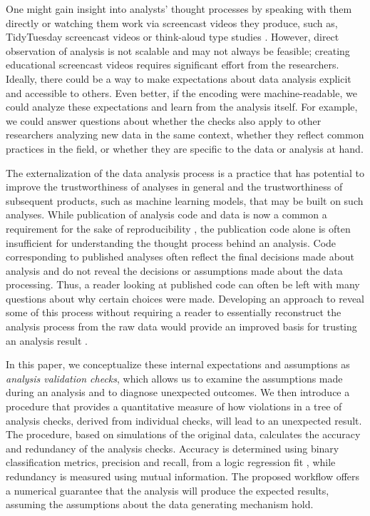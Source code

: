 \documentclass[
  12pt,
]{interact}
\begin{document}
One might gain insight into analysts' thought processes by speaking with
them directly or watching them work via screencast videos they produce,
such as, TidyTuesday screencast videos or think-aloud type studies
\citep[e.g.][]{gu2024data}. However, direct observation of analysis is
not scalable and may not always be feasible; creating educational
screencast videos requires significant effort from the researchers.
Ideally, there could be a way to make expectations about data analysis
explicit and accessible to others. Even better, if the encoding were
machine-readable, we could analyze these expectations and learn from the
analysis itself. For example, we could answer questions about whether
the checks also apply to other researchers analyzing new data in the
same context, whether they reflect common practices in the field, or
whether they are specific to the data or analysis at hand.

The externalization of the data analysis process is a practice that has
potential to improve the trustworthiness of analyses in general
\citep{yu2024veridical} and the trustworthiness of subsequent products,
such as machine learning models, that may be built on such analyses.
While publication of analysis code and data is now a common a
requirement for the sake of reproducibility
\citep{peng2011reproducible}, the publication code alone is often
insufficient for understanding the thought process behind an analysis.
Code corresponding to published analyses often reflect the final
decisions made about analysis and do not reveal the decisions or
assumptions made about the data processing. Thus, a reader looking at
published code can often be left with many questions about why certain
choices were made. Developing an approach to reveal some of this process
without requiring a reader to essentially reconstruct the analysis
process from the raw data would provide an improved basis for trusting
an analysis result \citep{peng2021reproducible}.

In this paper, we conceptualize these internal expectations and
assumptions as \emph{analysis validation checks}, which allows us to
examine the assumptions made during an analysis and to diagnose
unexpected outcomes. We then introduce a procedure that provides a
quantitative measure of how violations in a tree of analysis checks,
derived from individual checks, will lead to an unexpected result. The
procedure, based on simulations of the original data, calculates the
accuracy and redundancy of the analysis checks. Accuracy is determined
using binary classification metrics, precision and recall, from a logic
regression fit \citep{ruczinski_logic_2003}, while redundancy is
measured using mutual information. The proposed workflow offers a
numerical guarantee that the analysis will produce the expected results,
assuming the assumptions about the data generating mechanism hold.
\end{document}
